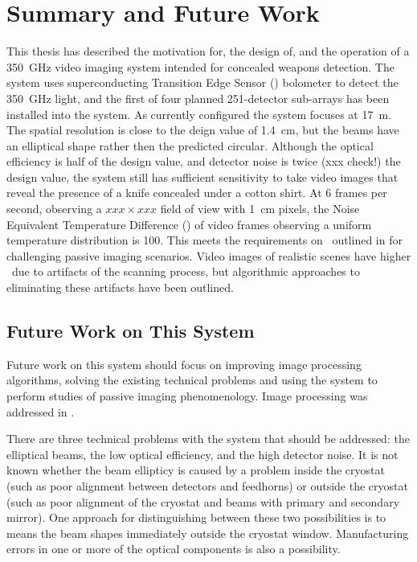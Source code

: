 \chapter{Summary and Future Work} \label{c:summary}

This thesis has described the motivation for, the design of, and the operation of a \SI{350}{\GHz} video imaging system intended for concealed weapons detection.
The system uses superconducting Transition Edge Sensor (\TES) bolometer to detect the \SI{350}{\GHz} light, and the first of four planned 251-detector sub-arrays has been installed into the system.
As currently configured the system focuses at \SI{17}{\m}.
The spatial resolution is close to the deign value of \SI{1.4}{\cm}, but the beams have an elliptical shape rather then the predicted circular.
Although the optical efficiency is half of the design value, and detector noise is twice (xxx check!) the design value, the system still has sufficient sensitivity to take video images that reveal the presence of a knife concealed under a cotton shirt.
At 6 frames per second, observing a $xxx \times xxx$ field of view with \SI{1}{\cm} pixels, the Noise Equivalent Temperature Difference (\NETD) of video frames observing a uniform temperature distribution is \SI{100}{\mK}.
This meets the requirements on \NETD\ outlined in  for challenging passive imaging scenarios.
Video images of realistic scenes have higher \NETD\ due to artifacts of the scanning process, but algorithmic approaches to eliminating these artifacts have been outlined.

\section{Future Work on This System}

Future work on this system should focus on improving image processing algorithms, solving the existing technical problems and using the system to perform studies of passive imaging phenomenology.
Image processing was addressed in .

There are three technical problems with the system that should be addressed: the elliptical beams, the low optical efficiency, and the high detector noise.
It is not known whether the beam ellipticy is caused by a problem inside the cryostat (such as poor alignment between detectors and feedhorns) or outside the cryostat (such as poor alignment of the cryostat and beams with primary and secondary mirror).
One approach for distinguishing between these two possibilities is to means the beam shapes immediately outside the cryostat window.
Manufacturing errors in one or more of the optical components is also a possibility.

